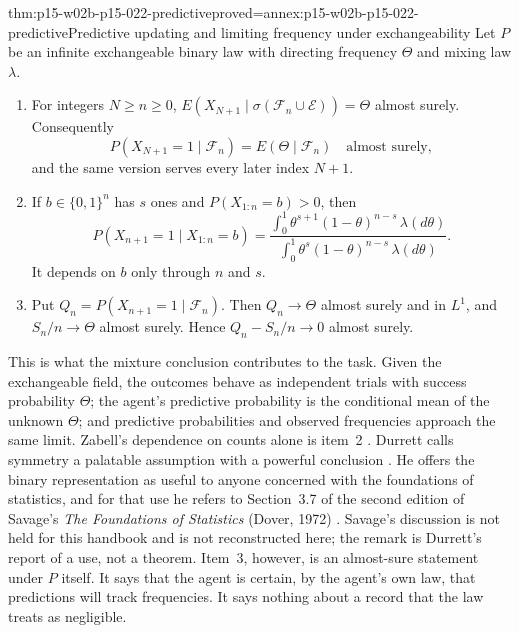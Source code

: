 \begin{hbtheorem}{thm:p15-w02b-p15-022-predictive}{proved=annex:p15-w02b-p15-022-predictive}{Predictive updating and limiting frequency under exchangeability}
Let \(P\) be an infinite exchangeable binary law with directing frequency
\(\Theta\) and mixing law \(\lambda\).
\begin{enumerate}
\item For integers \(N\geq n\geq0\),
      \(E(X_{N+1}\mid\sigma(\mathcal F_n\cup\mathcal E))=\Theta\) almost
      surely. Consequently
      \[
        P(X_{N+1}=1\mid\mathcal F_n)=E(\Theta\mid\mathcal F_n)
                                         \quad\text{almost surely},
      \]
      and the same version serves every later index \(N+1\).
\item If \(b\in\{0,1\}^n\) has \(s\) ones and \(P(X_{1:n}=b)>0\), then
      \[
       P(X_{n+1}=1\mid X_{1:n}=b)
          =\frac{\int_0^1\theta^{s+1}(1-\theta)^{n-s}\,\lambda(d\theta)}
                {\int_0^1\theta^{s}(1-\theta)^{n-s}\,\lambda(d\theta)}.
      \]
      It depends on \(b\) only through \(n\) and \(s\).
\item Put \(Q_n=P(X_{n+1}=1\mid\mathcal F_n)\). Then \(Q_n\to\Theta\)
      almost surely and in \(L^1\), and \(S_n/n\to\Theta\) almost surely.
      Hence \(Q_n-S_n/n\to0\) almost surely.
\end{enumerate}
\end{hbtheorem}

This is what the mixture conclusion contributes to the task. Given the
exchangeable field, the outcomes behave as independent trials with success
probability \(\Theta\); the agent's predictive probability is the
conditional mean of the unknown \(\Theta\); and predictive probabilities and
observed frequencies approach the same limit. Zabell's dependence on counts
alone is item~2 \cite[p.~273]{Zabell2011CarnapInductiveInference}.
Durrett calls symmetry a palatable assumption with a powerful conclusion
\cite[p.~255]{DurrettPTEAuthor2019}. He offers the binary representation
as useful to anyone concerned with the foundations of statistics, and for
that use he refers to Section~3.7 of the second edition of Savage's
\emph{The Foundations of Statistics} (Dover, 1972)
\cite[p.~255]{DurrettPTEAuthor2019}. Savage's discussion is not held for
this handbook and is not reconstructed here; the remark is Durrett's
report of a use, not a theorem. Item~3, however, is an almost-sure
statement under \(P\) itself. It says that the agent is certain, by the
agent's own law, that predictions will track frequencies. It says nothing
about a record that the law treats as negligible.

